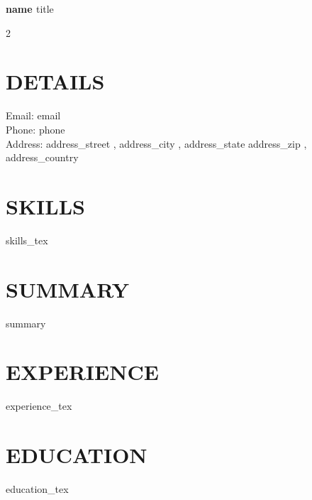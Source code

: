 \documentclass[11pt,a4paper]{article}
\begin{document}
\noindent
{\Huge\bfseries {{ name }}}\hfill{\large\color{graytext} {{ title }}}

\vspace{20pt}

\begin{multicols}{2}

\begin{tcolorbox}[sidebarstyle]
\section*{DETAILS}
Email: {{ email }} \\[2pt]
Phone: {{ phone }} \\[2pt]
Address: {{ address_street }}, {{ address_city }}, {{ address_state }} {{ address_zip }}, {{ address_country }}

\vspace{12pt}
\section*{SKILLS}
{{ skills_tex }}
\end{tcolorbox}

\columnbreak
\section*{SUMMARY}
{{ summary }}

\vspace{12pt}
\section*{EXPERIENCE}
{{ experience_tex }}

\vspace{12pt}
\section*{EDUCATION}
{{ education_tex }}

\end{multicols}
\end{document}
